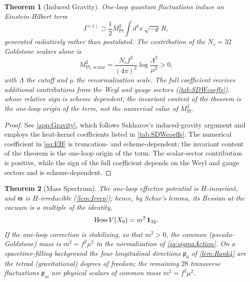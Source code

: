 \documentclass[pdflatex,sn-mathphys-num]{sn-jnl}
\theoremstyle{thmstyleone}
\newtheorem{theorem}{Theorem}
\theoremstyle{thmstylethree}%
\theoremstyle{thmstyletwo}%
\begin{document}
\begin{theorem}[Induced Gravity]\label{thm:inducedEH}
One-loop quantum fluctuations induce an Einstein-Hilbert term
\begin{equation}\label{eq:EH}
  \Gamma^{ (1)} \supset \frac12 M_{\mathrm{Pl}}^{ 2} \int d^{4}x\, \sqrt{-g}\, R,
\end{equation}
generated radiatively rather than postulated. The contribution of the
$N_{s}=32$ Goldstone scalars alone is
\[
  M_{\mathrm{Pl},\,\mathrm{scalar}}^{2}
  = \frac{N_{s} f^{2}}{(4\pi)^{2}} \log\frac{\Lambda^{2}}{\mu^{2}}>0,
\]
with $\Lambda$ the cutoff and $\mu$ the renormalization scale. The full
coefficient receives additional contributions from the Weyl and gauge sectors
(\autoref{tab:SDWcoeffs}), whose relative sign is scheme dependent; the
invariant content of the theorem is the one-loop origin of the term, not the
numerical value of $M_{\mathrm{Pl}}^{2}$.
\end{theorem}

\begin{proof}
See \autoref{app:Gravity}, which follows Sakharov's induced-gravity
argument and employs the heat-kernel coefficients listed in
\autoref{tab:SDWcoeffs}. The numerical coefficient in \eqref{eq:EH} is
truncation- and scheme-dependent; the invariant content of the theorem is the
one-loop origin of the term. The scalar-sector contribution is positive, while
the sign of the full coefficient depends on the Weyl and gauge sectors and is
scheme-dependent.
\end{proof}

\begin{theorem}[Mass Spectrum]
\label{thm:Mass28}
The one-loop effective potential is $H$-invariant, and $\mathfrak m$ is
$H$-irreducible (\autoref{lem:Irrep}); hence, by Schur's lemma, its Hessian at
the vacuum is a multiple of the identity,
\[
  \operatorname{Hess} V(X_{0})=m^{2}\,\mathbf 1_{32}.
\]
If the one-loop correction is stabilizing, so that $m^{2}>0$, the common
(pseudo-Goldstone) mass is $m^{2}=f^{2}\mu^{2}$ in the normalization of
\eqref{eq:sigmaAction}.
On a spacetime-filling background the four longitudinal directions
$\mathfrak p_{0}$ of \autoref{lem:Rank4} are the tetrad (gravitational) degrees
of freedom; the remaining $28$ transverse fluctuations $\mathfrak p_{m}$ are
physical scalars of common mass $m^{2}=f^{2}\mu^{2}$.
\end{theorem}
\end{document}
